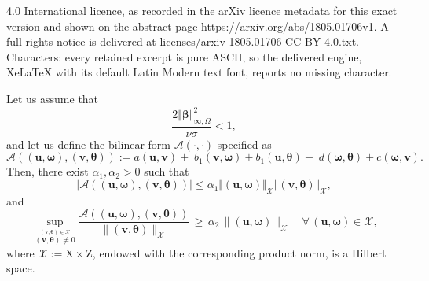 \documentclass[10pt,a4paper]{amsart}
\newcommand\X{\mathrm{X}}
\newcommand\Z{\mathrm{Z}}
\newcommand\bbbeta{\boldsymbol{\beta}}
\newcommand\bomega{\boldsymbol{\omega}}
\newcommand\btheta{\boldsymbol{\theta}}
\newcommand\bu{\boldsymbol{u}}
\newcommand\bv{\boldsymbol{v}}
\newcommand\disp{\displaystyle}
\renewcommand\O{\Omega}
\begin{document}
4.0 International licence, as recorded in the arXiv licence metadata for this exact version and shown on the abstract page https://arxiv.org/abs/1805.01706v1. A full rights notice is delivered at licenses/arxiv-1805.01706-CC-BY-4.0.txt. Characters: every retained excerpt is pure ASCII, so the delivered engine, XeLaTeX with its default Latin Modern text font, reports no missing character.
\begin{lemma}\label{le1:continuous-problem}
Let us assume that 
\begin{equation}\label{beta-assumption}
\frac{2\Vert\bbbeta\Vert_{\infty,\O}^2}{\nu\sigma}< 1,
\end{equation}
and let us define the bilinear form $\mathcal{A}(\cdot,\cdot)$ specified as 
$$\mathcal A((\bu,\bomega),(\bv,\btheta)):=a(\bu,\bv)+\;b_{1}(\bv,\bomega)+b_{1}(\bu,\btheta)-\;d(\bomega,\btheta)+c(\bomega,\bv).$$
Then, there exist $\alpha_1,\alpha_2>0$ such that
\begin{equation}\label{acot}
\vert\mathcal A((\bu,\bomega),(\bv,\btheta))\vert\le \alpha_1\Vert(\bu,\bomega)\Vert_{\mathcal X}\Vert(\bv,\btheta)\Vert_{\mathcal X},
\end{equation}
and
\begin{equation}\label{cont-inf-sup-Aa}
\disp\,\sup_{\stackrel{\scriptstyle (\bv,\btheta)\in {\mathcal X}}{(\bv,\btheta)\ne0}}
\frac{\mathcal A((\bu,\bomega),(\bv,\btheta))}{\|(\bv,\btheta)\|_{\mathcal X}}\,\ge\,\alpha_2\,\|(\bu,\bomega)\|_{\mathcal X}
\quad\forall\,(\bu,\bomega)\in \mathcal X,
\end{equation}
where $\mathcal X:=\X\times\Z$, endowed
with the corresponding product norm, is a Hilbert space.
\end{lemma}
\end{document}
